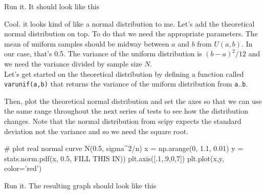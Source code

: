 \begin{fullwidth}
\step Run it. It should look like this \\


Cool. it looks kind of like a normal distribution to me. Let's add the theoretical normal distribution on top. To do that we need the appropriate parameters. The mean of uniform samples should be midway between $a$ and $b$ from $U(a,b)$. In our case, that's 0.5. The variance of the uniform distribution is $(b-a)^2/12$ and we need the variance divided by sample size $N$. \\

\step  Let's get started on the theoretical distribution by defining a function called {\tt varunif(a,b)} that returns the variance of the uniform distribution from {\tt a}..{\tt b}.  

\step Then, plot the theoretical normal distribution and set the axes so that we can use the same range throughout the next series of tests to see how the distribution changes. Note that the normal distribution from scipy expects the standard deviation not the variance and so we need the square root.

\begin{pyverbatim}
# plot real normal curve N(0.5, sigma^2/n)
x = np.arange(0, 1.1, 0.01)
y = stats.norm.pdf(x, 0.5, FILL THIS IN))
plt.axis([.1,.9,0,7])
plt.plot(x,y, color='red')
\end{pyverbatim}

\step Run it. The resulting graph should look like this \\


\end{fullwidth}
